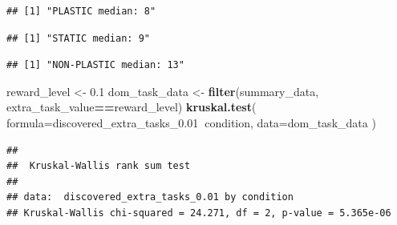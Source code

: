 \documentclass[]{book}
\newenvironment{Shaded}{\begin{snugshade}}{\end{snugshade}}
\newcommand{\DataTypeTok}[1]{\textcolor[rgb]{0.13,0.29,0.53}{#1}}
\newcommand{\FloatTok}[1]{\textcolor[rgb]{0.00,0.00,0.81}{#1}}
\newcommand{\KeywordTok}[1]{\textcolor[rgb]{0.13,0.29,0.53}{\textbf{#1}}}
\newcommand{\NormalTok}[1]{#1}
\newcommand{\OperatorTok}[1]{\textcolor[rgb]{0.81,0.36,0.00}{\textbf{#1}}}
\newcommand{\StringTok}[1]{\textcolor[rgb]{0.31,0.60,0.02}{#1}}
\begin{document}
\begin{verbatim}
## [1] "PLASTIC median: 8"
\end{verbatim}

\begin{Shaded}
\end{Shaded}

\begin{verbatim}
## [1] "STATIC median: 9"
\end{verbatim}

\begin{Shaded}
\end{Shaded}

\begin{verbatim}
## [1] "NON-PLASTIC median: 13"
\end{verbatim}

\begin{Shaded}
\begin{Highlighting}[]
\NormalTok{reward_level <-}\StringTok{ }\FloatTok{0.1}
\NormalTok{dom_task_data <-}\StringTok{ }\KeywordTok{filter}\NormalTok{(summary_data, extra_task_value}\OperatorTok{==}\NormalTok{reward_level)}
\KeywordTok{kruskal.test}\NormalTok{(}
  \DataTypeTok{formula=}\NormalTok{discovered_extra_tasks_}\FloatTok{0.01}\OperatorTok{~}\NormalTok{condition,}
  \DataTypeTok{data=}\NormalTok{dom_task_data}
\NormalTok{)}
\end{Highlighting}
\end{Shaded}

\begin{verbatim}
## 
##  Kruskal-Wallis rank sum test
## 
## data:  discovered_extra_tasks_0.01 by condition
## Kruskal-Wallis chi-squared = 24.271, df = 2, p-value = 5.365e-06
\end{verbatim}
\end{document}
